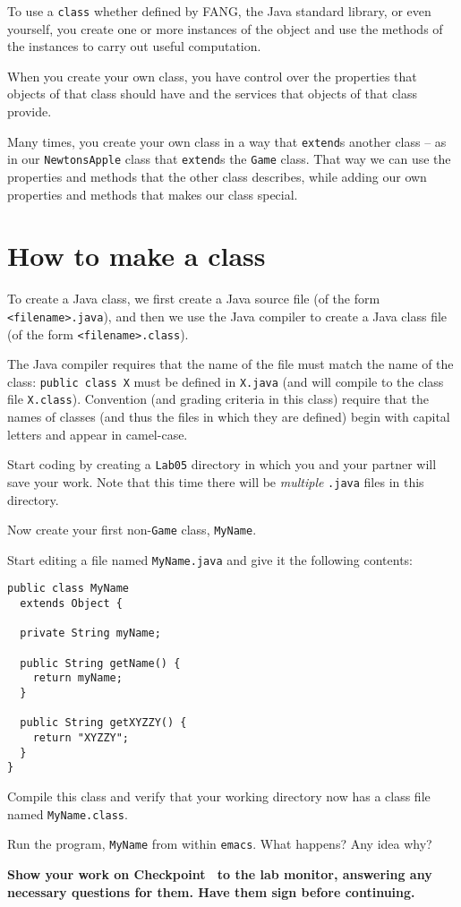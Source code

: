 \documentclass[12pt,twoside]{memoir}
\newcommand\code[1]{\lstinline^#1^}
\newcommand\fname[1]{\texttt{#1}}
\newenvironment{Checkpoint}[1]{%
\begin{Exercise}[name={Checkpoint},title={#1}]}{%
\end{Exercise}%
\textbf{Show your work on Checkpoint~\theExercise{} to the lab monitor, %
  answering any necessary questions for them.  Have them sign before continuing.}}
\begin{document}
To use a \code{class} whether defined by FANG, the Java standard
library, or even yourself, you create one or more instances of the
object and use the methods of the instances to carry out useful
computation.

When you create your own class, you have control over the properties
that objects of that class should have and the services that objects
of that class provide.

Many times, you create your own class in a way that \code{extend}s
another class -- as in our \code{NewtonsApple} class that
\code{extend}s the \code{Game} class.  That way we can use the
properties and methods that the other class describes, while adding
our own properties and methods that makes our class special.

\section*{How to make a class}

To create a Java class, we first create a Java source file (of the
form \fname{<filename>.java}), and then we use the Java compiler to
create a Java class file (of the form \fname{<filename>.class}).

The Java compiler requires that the name of the file must match the
name of the class: \code{public class X} must be defined in
\fname{X.java} (and will compile to the class file
\fname{X.class}). Convention (and grading criteria in this class)
require that the names of classes (and thus the files in which they
are defined) begin with capital letters and appear in camel-case. 

\begin{Checkpoint}{Multiple \code{.java} files.}
Start coding by creating a \fname{Lab05} directory in which you and
your partner will save your work. Note that this time there will be
\emph{multiple} \fname{.java} files in this directory.

Now create your first non-\code{Game} class, \code{MyName}. 

Start editing a file named \code{MyName.java} and give it the
following contents:

\begin{lstlisting}
public class MyName 
  extends Object {

  private String myName;

  public String getName() {
    return myName;
  }

  public String getXYZZY() {
    return "XYZZY";
  }
}
\end{lstlisting}

Compile this class and verify that your working directory now has a
class file named \code{MyName.class}.

Run the program, \code{MyName} from within \fname{emacs}. What
happens? Any idea why?
\end{Checkpoint}
\end{document}
